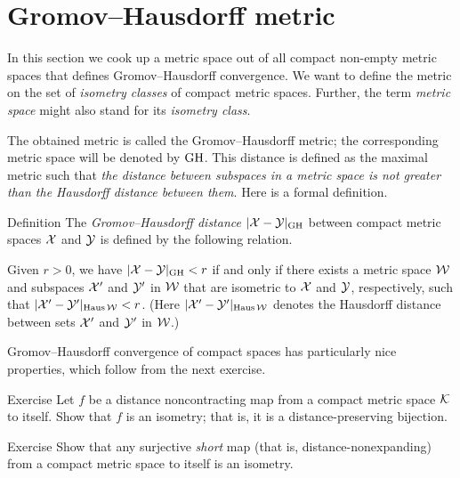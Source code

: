 \section{Gromov--Hausdorff metric}\label{sec:Gromov--Hausdorff-metric}

In this section we cook up a metric space out of all compact non-empty metric spaces
that defines Gromov--Hausdorff convergence.
We want to define the metric on the set of \textit{isometry classes} of compact metric spaces.
Further, the term \textit{metric space} might also stand for its \textit{isometry class}.

The obtained metric is called the Gromov--Hausdorff metric;
the corresponding metric space will be denoted by $\operatorname{\rm GH}\nolimits$.
This distance is defined as the maximal metric such that \textit{the distance between subspaces in a metric space is not greater than the Hausdorff distance between them}.
Here is a formal definition.

\begin{thm}{Definition}\label{def:GH}
The \emph{Gromov--Hausdorff distance} $|\mathcal{X}-\mathcal{Y}|_{\operatorname{\rm GH}\nolimits}$ between compact metric spaces $\mathcal{X}$ and $\mathcal{Y}$
is defined by the following
relation.
 
Given  $r > 0$, we have $|\mathcal{X}-\mathcal{Y}|_{\operatorname{\rm GH}\nolimits} < r$ if and only if there exists a metric
space $\mathcal{W}$ and subspaces $\mathcal{X}'$ and $\mathcal{Y}'$ in $\mathcal{W}$ that are isometric to $\mathcal{X}$ and $\mathcal{Y}$,
respectively, such that $|\mathcal{X}'-\mathcal{Y}'|_{\operatorname{\rm Haus}\nolimits\mathcal{W}} < r$. 
(Here $|\mathcal{X}'-\mathcal{Y}'|_{\operatorname{\rm Haus}\nolimits\mathcal{W}}$ denotes the Hausdorff distance between sets $\mathcal{X}'$ and $\mathcal{Y}'$ in $\mathcal{W}$.)
\end{thm}

Gromov--Hausdorff convergence of compact spaces has particularly nice properties, which follow from the next exercise.

\begin{thm}{Exercise}\label{ex:non-contracting-map}
Let $f$ be a distance noncontracting map from
a compact metric space $\mathcal{K}$ to itself.
Show that $f$ is an isometry; that is, it is a distance-preserving bijection.
\end{thm}

\begin{thm}{Exercise}\label{ex:non-expanding-map}
Show that any surjective \emph{short} map (that is, distance-nonexpanding) from a compact metric space to itself is an isometry.
\end{thm}

